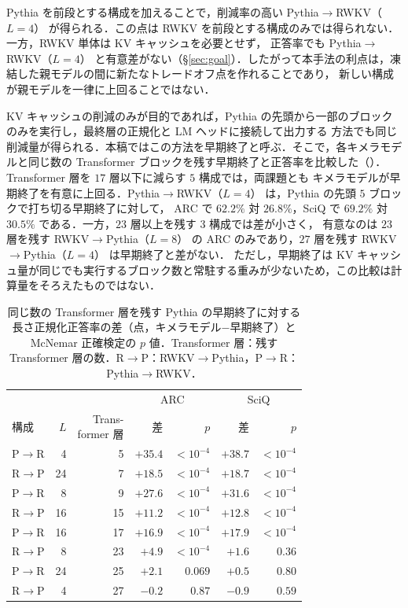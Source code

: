 \documentclass[techrep,noauthor]{ipsj}
\newcommand{\RtoP}{RWKV$\to$\allowbreak Pythia}
\newcommand{\PtoR}{Pythia$\to$\allowbreak RWKV}
\newcommand{\RtoPL}[1]{\RtoP{}（$L{=}#1$）}
\newcommand{\PtoRL}[1]{\PtoR{}（$L{=}#1$）}
\begin{document}
Pythia を前段とする構成を加えることで，削減率の高い \PtoRL{4} が得られる．この点は RWKV を前段とする構成のみでは得られない．
一方，RWKV 単体は KV キャッシュを必要とせず，
正答率でも \PtoRL{4} と有意差がない（\S\ref{sec:goal}）．したがって本手法の利点は，凍結した親モデルの間に新たなトレードオフ点を作れることであり，
新しい構成が親モデルを一律に上回ることではない．

KV キャッシュの削減のみが目的であれば，Pythia の先頭から一部のブロックのみを実行し，最終層の正規化と LM ヘッドに接続して出力する
方法でも同じ削減量が得られる．本稿ではこの方法を早期終了と呼ぶ．そこで，各キメラモデルと同じ数の Transformer ブロックを残す早期終了と正答率を比較した（）．Transformer 層を $17$ 層以下に減らす $5$ 構成では，両課題とも
キメラモデルが早期終了を有意に上回る．\PtoRL{4} は，Pythia の先頭 $5$ ブロックで打ち切る早期終了に対して，
ARC で $62.2\%$ 対 $26.8\%$，SciQ で $69.2\%$ 対 $30.5\%$ である．一方，$23$ 層以上を残す $3$ 構成では差が小さく，
有意なのは $23$ 層を残す \RtoPL{8} の ARC のみであり，$27$ 層を残す \RtoPL{4} は早期終了と差がない．
ただし，早期終了は KV キャッシュ量が同じでも実行するブロック数と常駐する重みが少ないため，この比較は計算量をそろえたものではない．

\begin{table}[!t]\centering\small
\caption{同じ数の Transformer 層を残す Pythia の早期終了に対する長さ正規化正答率の差（点，キメラモデル$-$早期終了）と McNemar 正確検定の $p$ 値．Transformer 層：残す Transformer 層の数．R$\to$P：RWKV$\to$Pythia，P$\to$R：Pythia$\to$RWKV．}\label{tab:earlyexit}
\setlength{\tabcolsep}{3pt}
\begin{tabular}{lrrrrrr}\toprule
& & & \multicolumn{2}{c}{ARC} & \multicolumn{2}{c}{SciQ}\\
\cmidrule(lr){4-5}\cmidrule(lr){6-7}
構成 & $L$ & \shortstack{Trans-\\former 層} & 差 & $p$ & 差 & $p$\\\midrule
P$\to$R & 4  & 5  & $+35.4$ & $<10^{-4}$ & $+38.7$ & $<10^{-4}$\\
R$\to$P & 24 & 7  & $+18.5$ & $<10^{-4}$ & $+18.7$ & $<10^{-4}$\\
P$\to$R & 8  & 9  & $+27.6$ & $<10^{-4}$ & $+31.6$ & $<10^{-4}$\\
R$\to$P & 16 & 15 & $+11.2$ & $<10^{-4}$ & $+12.8$ & $<10^{-4}$\\
P$\to$R & 16 & 17 & $+16.9$ & $<10^{-4}$ & $+17.9$ & $<10^{-4}$\\
R$\to$P & 8  & 23 & $+4.9$ & $<10^{-4}$ & $+1.6$ & $0.36$\\
P$\to$R & 24 & 25 & $+2.1$ & $0.069$ & $+0.5$ & $0.80$\\
R$\to$P & 4  & 27 & $-0.2$ & $0.87$ & $-0.9$ & $0.59$\\\bottomrule
\end{tabular}
\end{table}
\end{document}
